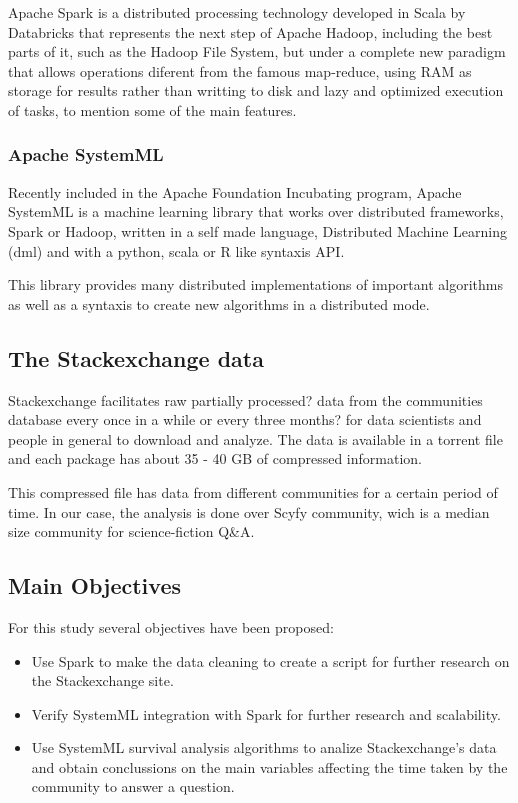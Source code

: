 \documentclass[11pt]{article} %
\begin{document}
Apache Spark is a distributed processing technology developed in Scala by Databricks that represents the next step of Apache Hadoop, including the best parts of it, such as the Hadoop File System, but under a complete new paradigm that allows operations diferent from the famous map-reduce, using RAM as storage for results rather than writting to disk and lazy and optimized execution of tasks, to mention some of the main features.

\subsubsection{Apache SystemML}

Recently included in the Apache Foundation Incubating  program, Apache SystemML is a machine learning library that works over distributed frameworks, Spark or Hadoop, written in a self made language, Distributed Machine Learning (dml) and with a python, scala or R like syntaxis API.

This library provides many distributed implementations of important algorithms as well as a syntaxis to create new algorithms in a distributed mode.

\subsection{The Stackexchange data}

Stackexchange facilitates raw {partially processed?} data from the communities database every once in a while {or every three months?} for data scientists and people in general to download and analyze. The data is available in a torrent file and each package has about 35 - 40 GB of compressed information.

This compressed file has data from different communities for a certain period of time. In our case, the analysis is done over Scyfy community, wich is a median size community for science-fiction Q\&A.

\subsection{Main Objectives}

For this study several objectives have been proposed:

\begin{itemize}

  \item Use Spark to make the data cleaning to create a script for further research on the Stackexchange site.

  \item Verify SystemML integration with Spark for further research and scalability.

  \item Use SystemML survival analysis algorithms to analize Stackexchange's data and obtain conclussions on the main variables affecting the time taken by the community to answer a question.

\end{itemize}
\end{document}
